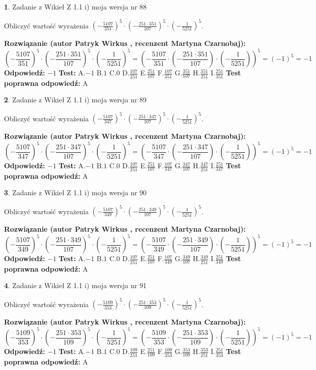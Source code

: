 \documentclass[12pt, a4paper]{article}
\theoremstyle{definition} %
\newtheorem{zad}{}
\newcommand{\zadStart}[1]{\begin{zad}#1\newline}
\newcommand{\zadStop}{\end{zad}}
\newcommand{\rozwStart}[2]{\noindent \textbf{Rozwiązanie (autor #1 , recenzent #2): }\newline}
\newcommand{\rozwStop}{\newline}
\newcommand{\odpStart}{\noindent \textbf{Odpowiedź:}\newline}
\newcommand{\odpStop}{\newline}
\newcommand{\testStart}{\noindent \textbf{Test:}\newline}
\newcommand{\testStop}{\newline}
\newcommand{\kluczStart}{\noindent \textbf{Test poprawna odpowiedź:}\newline}
\newcommand{\kluczStop}{\newline}
\begin{document}
\zadStart{Zadanie z Wikieł Z 1.1 i) moja wersja nr 88}

Obliczyć wartość wyrażenia $(-\frac{5107}{351})^{5} \cdot (-\frac{251 \cdot 351}{107})^{5} \cdot (-\frac{1}{5251})^{5}$.
\zadStop
\rozwStart{Patryk Wirkus}{Martyna Czarnobaj}
$$(-\frac{5107}{351})^{5} \cdot (-\frac{251 \cdot 351}{107})^{5} \cdot (-\frac{1}{5251})^{5} = (-\frac{5107}{351} \cdot (-\frac{251 \cdot 351}{107}) \cdot (-\frac{1}{5251}))^{5} = (-1)^{5} = -1$$
\rozwStop
\odpStart
$-1$
\odpStop
\testStart
A.$-1$ B.$1$ C.$0$ D.$\frac{107}{251}$ E.$\frac{251}{107}$
F.$\frac{107}{351}$ G.$\frac{351}{107}$
H.$\frac{351}{251}$
I.$\frac{251}{351}$
\testStop
\kluczStart
A
\kluczStop



\zadStart{Zadanie z Wikieł Z 1.1 i) moja wersja nr 89}

Obliczyć wartość wyrażenia $(-\frac{5107}{347})^{5} \cdot (-\frac{251 \cdot 347}{107})^{5} \cdot (-\frac{1}{5251})^{5}$.
\zadStop
\rozwStart{Patryk Wirkus}{Martyna Czarnobaj}
$$(-\frac{5107}{347})^{5} \cdot (-\frac{251 \cdot 347}{107})^{5} \cdot (-\frac{1}{5251})^{5} = (-\frac{5107}{347} \cdot (-\frac{251 \cdot 347}{107}) \cdot (-\frac{1}{5251}))^{5} = (-1)^{5} = -1$$
\rozwStop
\odpStart
$-1$
\odpStop
\testStart
A.$-1$ B.$1$ C.$0$ D.$\frac{107}{251}$ E.$\frac{251}{107}$
F.$\frac{107}{347}$ G.$\frac{347}{107}$
H.$\frac{347}{251}$
I.$\frac{251}{347}$
\testStop
\kluczStart
A
\kluczStop



\zadStart{Zadanie z Wikieł Z 1.1 i) moja wersja nr 90}

Obliczyć wartość wyrażenia $(-\frac{5107}{349})^{5} \cdot (-\frac{251 \cdot 349}{107})^{5} \cdot (-\frac{1}{5251})^{5}$.
\zadStop
\rozwStart{Patryk Wirkus}{Martyna Czarnobaj}
$$(-\frac{5107}{349})^{5} \cdot (-\frac{251 \cdot 349}{107})^{5} \cdot (-\frac{1}{5251})^{5} = (-\frac{5107}{349} \cdot (-\frac{251 \cdot 349}{107}) \cdot (-\frac{1}{5251}))^{5} = (-1)^{5} = -1$$
\rozwStop
\odpStart
$-1$
\odpStop
\testStart
A.$-1$ B.$1$ C.$0$ D.$\frac{107}{251}$ E.$\frac{251}{107}$
F.$\frac{107}{349}$ G.$\frac{349}{107}$
H.$\frac{349}{251}$
I.$\frac{251}{349}$
\testStop
\kluczStart
A
\kluczStop



\zadStart{Zadanie z Wikieł Z 1.1 i) moja wersja nr 91}

Obliczyć wartość wyrażenia $(-\frac{5109}{353})^{5} \cdot (-\frac{251 \cdot 353}{109})^{5} \cdot (-\frac{1}{5251})^{5}$.
\zadStop
\rozwStart{Patryk Wirkus}{Martyna Czarnobaj}
$$(-\frac{5109}{353})^{5} \cdot (-\frac{251 \cdot 353}{109})^{5} \cdot (-\frac{1}{5251})^{5} = (-\frac{5109}{353} \cdot (-\frac{251 \cdot 353}{109}) \cdot (-\frac{1}{5251}))^{5} = (-1)^{5} = -1$$
\rozwStop
\odpStart
$-1$
\odpStop
\testStart
A.$-1$ B.$1$ C.$0$ D.$\frac{109}{251}$ E.$\frac{251}{109}$
F.$\frac{109}{353}$ G.$\frac{353}{109}$
H.$\frac{353}{251}$
I.$\frac{251}{353}$
\testStop
\kluczStart
A
\kluczStop
\end{document}
